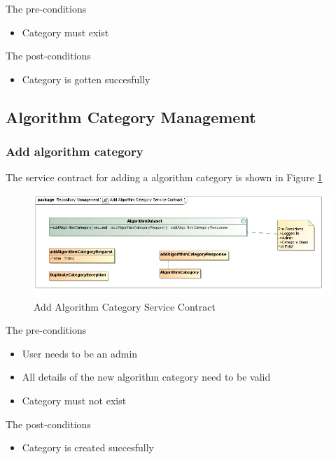 The pre-conditions
\begin{itemize}
  \item Category must exist
\end{itemize}

The post-conditions
\begin{itemize}
  \item Category is gotten succesfully
\end{itemize}

\subsection{Algorithm Category Management}

\subsubsection {Add algorithm category}
The service contract for adding a algorithm category is shown in Figure \ref{fig:addAlgorithmCatService}
\begin{figure}[H]
  \begin{center}
  \includegraphics[scale=0.6]{../Diagrams and Charts/Test Data/Add Algorithm Category Service Contract.jpg}
  \caption{Add Algorithm Category Service Contract}
  \label{fig:addAlgorithmCatService}
  \end{center}
  
\end{figure}

The pre-conditions
\begin{itemize}
  \item User needs to be an admin
  \item All details of the new algorithm category need to be valid
  \item Category must not exist
\end{itemize}

The post-conditions
\begin{itemize}
  \item Category is created succesfully
\end{itemize}

